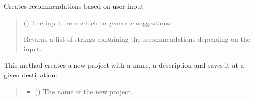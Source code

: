 \documentclass[letterpaper,10pt,english]{sphinxmanual}
\begin{document}
\begin{fulllineitems}
\begin{fulllineitems}
\begin{quote}
\begin{description}
\end{description}\end{quote}

\end{fulllineitems}


\begin{fulllineitems}
\label{\detokenize{apidoc/src.osm_configurator.model.application:src.osm_configurator.model.application.application.Application.get_key_recommendation}}
\pysigstartsignatures
{}
\pysigstopsignatures
\sphinxAtStartPar
Creates recommendations based on user input
\begin{quote}\begin{description}
\sphinxAtStartPar
{} () \textendash{} The input from which to generate suggestions.

\sphinxAtStartPar
Returns a list of strings containing the recommendations depending on the input.

\sphinxAtStartPar
\sphinxhref{https://docs.python.org/3.11/library/stdtypes.html\#list}{list}{[}\sphinxhref{https://docs.python.org/3.11/library/stdtypes.html\#str}{str}{]}

\end{description}\end{quote}

\end{fulllineitems}


\begin{fulllineitems}
\label{\detokenize{apidoc/src.osm_configurator.model.application:src.osm_configurator.model.application.application.Application.create_project}}
\pysigstartsignatures
{}
\pysigstopsignatures
\sphinxAtStartPar
This method creates a new project with a name, a description and saves it at a given destination.
\begin{quote}\begin{description}
\begin{itemize}
\item {} 
\sphinxAtStartPar
{} () \textendash{} The name of the new project.


\end{itemize}
\end{description}
\end{quote}
\end{fulllineitems}
\end{fulllineitems}
\end{document}

